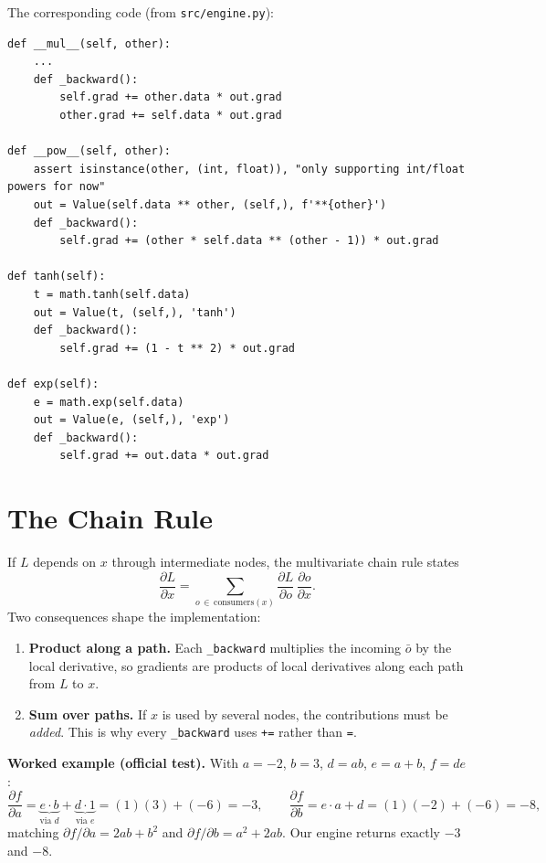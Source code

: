 \documentclass[11pt,a4paper]{article}
\begin{document}
The corresponding code (from \texttt{src/engine.py}):
\begin{lstlisting}
def __mul__(self, other):
    ...
    def _backward():
        self.grad += other.data * out.grad
        other.grad += self.data * out.grad

def __pow__(self, other):
    assert isinstance(other, (int, float)), "only supporting int/float powers for now"
    out = Value(self.data ** other, (self,), f'**{other}')
    def _backward():
        self.grad += (other * self.data ** (other - 1)) * out.grad

def tanh(self):
    t = math.tanh(self.data)
    out = Value(t, (self,), 'tanh')
    def _backward():
        self.grad += (1 - t ** 2) * out.grad

def exp(self):
    e = math.exp(self.data)
    out = Value(e, (self,), 'exp')
    def _backward():
        self.grad += out.data * out.grad
\end{lstlisting}

\section{The Chain Rule}
If $L$ depends on $x$ through intermediate nodes, the multivariate chain rule states
\[
\frac{\partial L}{\partial x} = \sum_{o\,\in\,\text{consumers}(x)} \frac{\partial L}{\partial o}\,\frac{\partial o}{\partial x}.
\]
Two consequences shape the implementation:
\begin{enumerate}
  \item \textbf{Product along a path.} Each \texttt{\_backward} multiplies the incoming $\bar o$ by the local
        derivative, so gradients are products of local derivatives along each path from $L$ to $x$.
  \item \textbf{Sum over paths.} If $x$ is used by several nodes, the contributions must be \emph{added}.
        This is why every \texttt{\_backward} uses \texttt{+=} rather than \texttt{=}.
\end{enumerate}
\textbf{Worked example (official test).} With $a=-2$, $b=3$, $d=ab$, $e=a+b$, $f=de$:
\[
\frac{\partial f}{\partial a} = \underbrace{e\cdot b}_{\text{via } d} + \underbrace{d\cdot 1}_{\text{via } e}
= (1)(3) + (-6) = -3,\qquad
\frac{\partial f}{\partial b} = e\cdot a + d = (1)(-2) + (-6) = -8,
\]
matching $\partial f/\partial a = 2ab + b^2$ and $\partial f/\partial b = a^2 + 2ab$. Our engine returns exactly $-3$ and $-8$.
\end{document}
